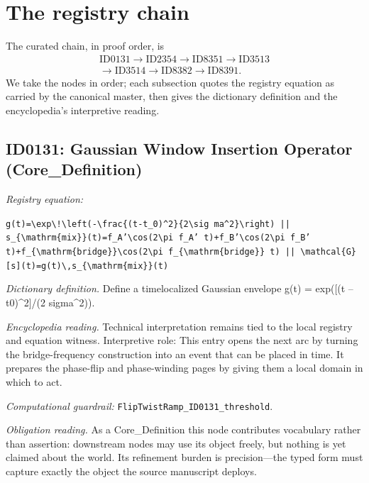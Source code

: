 \documentclass[11pt]{article}
\theoremstyle{remark}
\begin{document}
\section{The registry chain}
\label{sec:chain}

The curated chain, in proof order, is
\begin{equation*}
\begin{gathered}
\text{ID0131} \to \text{ID2354} \to \text{ID8351} \to \text{ID3513} \\
\to \text{ID3514} \to \text{ID8382} \to \text{ID8391}.
\end{gathered}
\end{equation*}
We take the nodes in order; each subsection quotes the registry equation as carried by the canonical master, then gives the dictionary definition and the encyclopedia's interpretive reading.

\subsection{ID0131: Gaussian Window Insertion Operator (Core\_Definition)}

\noindent\textit{Registry equation:}\par
{\small\texttt{g(t)=\textbackslash{}exp\textbackslash{}!\textbackslash{}left(-\textbackslash{}frac\{(t-t\_0)\textasciicircum{}2\}\{2\textbackslash{}sig ma\textasciicircum{}2\}\textbackslash{}right) || s\_\{\textbackslash{}mathrm\{mix\}\}(t)=f\_A'\textbackslash{}cos(2\textbackslash{}pi f\_A' t)+f\_B'\textbackslash{}cos(2\textbackslash{}pi f\_B' t)+f\_\{\textbackslash{}mathrm\{bridge\}\}\textbackslash{}cos(2\textbackslash{}pi f\_\{\textbackslash{}mathrm\{bridge\}\} t) || \textbackslash{}mathcal\{G\}[s](t)=g(t)\textbackslash{},s\_\{\textbackslash{}mathrm\{mix\}\}(t)}}\par\medskip
\noindent\textit{Dictionary definition.} Define a timelocalized Gaussian envelope g(t) = exp([(t -- t0)\textasciicircum{}2]/(2 sigma\textasciicircum{}2)).\par\medskip
\noindent\textit{Encyclopedia reading.} Technical interpretation remains tied to the local registry and equation witness. Interpretive role: This entry opens the next arc by turning the bridge-frequency construction into an event that can be placed in time. It prepares the phase-flip and phase-winding pages by giving them a local domain in which to act.
\par\medskip\noindent\textit{Computational guardrail:} \texttt{FlipTwistRamp\_ID0131\_threshold}.
\par\medskip\noindent\textit{Obligation reading.} As a Core\_Definition this node contributes vocabulary rather than assertion: downstream nodes may use its object freely, but nothing is yet claimed about the world. Its refinement burden is precision---the typed form must capture exactly the object the source manuscript deploys.
\end{document}

